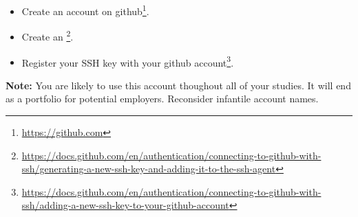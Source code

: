 \begin{itemize}
  \item Create an account on github\footnote{\url{https://github.com}}.
  \item Create an \footnote{\url{https://docs.github.com/en/authentication/connecting-to-github-with-ssh/generating-a-new-ssh-key-and-adding-it-to-the-ssh-agent}}.
  \item Register your SSH key with your github account\footnote{\url{https://docs.github.com/en/authentication/connecting-to-github-with-ssh/adding-a-new-ssh-key-to-your-github-account}}.
\end{itemize}

\textbf{Note:} You are likely to use this account thoughout all of your studies. It will end as a portfolio for potential employers. Reconsider infantile account names.
